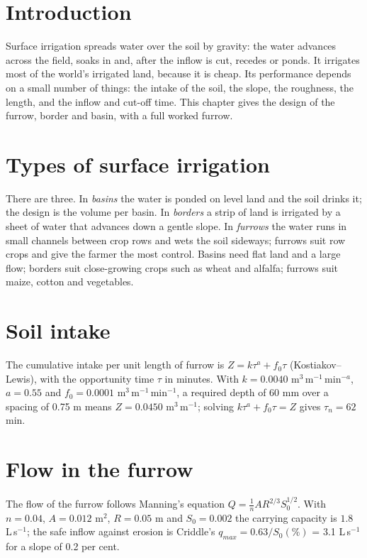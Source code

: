 \section{Introduction}
Surface irrigation spreads water over the soil by gravity: the water advances across the field, soaks in and, after the inflow is cut, recedes or ponds. It irrigates most of the world's irrigated land, because it is cheap. Its performance depends on a small number of things: the intake of the soil, the slope, the roughness, the length, and the inflow and cut-off time. This chapter gives the design of the furrow, border and basin, with a full worked furrow.

\section{Types of surface irrigation}
There are three. In \emph{basins} the water is ponded on level land and the soil drinks it; the design is the volume per basin. In \emph{borders} a strip of land is irrigated by a sheet of water that advances down a gentle slope. In \emph{furrows} the water runs in small channels between crop rows and wets the soil sideways; furrows suit row crops and give the farmer the most control. Basins need flat land and a large flow; borders suit close-growing crops such as wheat and alfalfa; furrows suit maize, cotton and vegetables.

\section{Soil intake}
The cumulative intake per unit length of furrow is $Z=k\tau^{a}+f_0\tau$ (Kostiakov--Lewis), with the opportunity time $\tau$ in minutes. With $k=0.0040$ m$^3$\,m$^{-1}$\,min$^{-a}$, $a=0.55$ and $f_0=0.0001$ m$^3$\,m$^{-1}$\,min$^{-1}$, a required depth of 60 mm over a spacing of 0.75 m means $Z=0.0450$ m$^3$\,m$^{-1}$; solving $k\tau^a+f_0\tau=Z$ gives $\tau_n=62$ min.

\section{Flow in the furrow}
The flow of the furrow follows Manning's equation $Q=\frac{1}{n}AR^{2/3}S_0^{1/2}$. With $n=0.04$, $A=0.012$ m$^2$, $R=0.05$ m and $S_0=0.002$ the carrying capacity is $1.8$ L\,s$^{-1}$; the safe inflow against erosion is Criddle's $q_{max}=0.63/S_0(\%)$ = 3.1 L\,s$^{-1}$ for a slope of 0.2 per cent.

